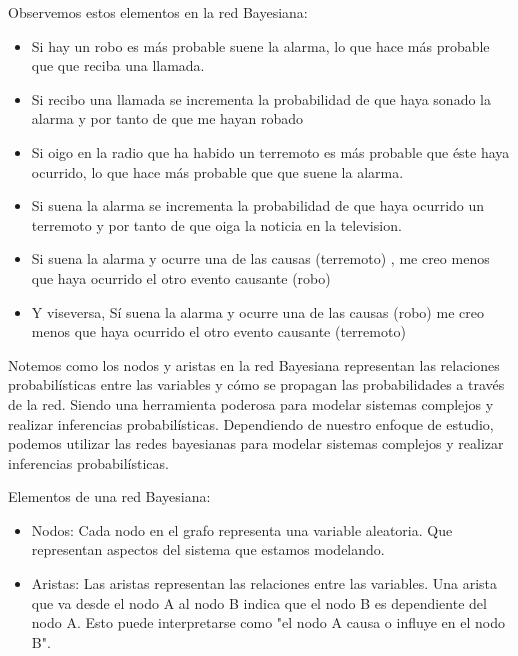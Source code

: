 \begin{enumerate}
Observemos estos elementos en la red Bayesiana:

\begin{itemize}
    \item Si hay un robo es más probable
    suene la alarma, lo que hace más probable que que reciba una llamada.
    
    \item Si recibo una llamada se incrementa
    la probabilidad de que haya sonado la alarma y por tanto de que me
    hayan robado
    
    \item Si oigo en la radio que ha habido un
    terremoto es más probable que éste haya ocurrido, lo que hace más
    probable que que suene la alarma.
    
    \item Si suena la alarma se incrementa la
    probabilidad de que haya ocurrido un terremoto y por tanto de que
    oiga la noticia en la television.
    
    \item Si suena la alarma y ocurre una de
    las causas (terremoto) , me creo menos que haya ocurrido el otro evento causante (robo)	
    
    \item Y viseversa, Sí suena la alarma y ocurre una de
    las causas (robo) me creo menos que haya ocurrido el otro evento causante (terremoto)
\end{itemize}

Notemos como los nodos y aristas en la red Bayesiana representan las relaciones probabilísticas entre las variables y cómo se propagan las probabilidades a través de la red. Siendo una herramienta poderosa para modelar sistemas complejos y realizar inferencias probabilísticas.
Dependiendo de nuestro enfoque de estudio, podemos utilizar las redes bayesianas para modelar sistemas complejos y realizar inferencias probabilísticas.

Elementos de una red Bayesiana:
\begin{itemize} 
    \item Nodos: Cada nodo en el grafo representa una variable aleatoria. Que representan aspectos del sistema que estamos modelando.
    \item Aristas: Las aristas representan las relaciones entre las variables. Una arista que va desde el nodo A al nodo B indica que el nodo B es dependiente del nodo A. Esto puede interpretarse como "el nodo A causa o influye en el nodo B".
\end{itemize}


\end{enumerate}
